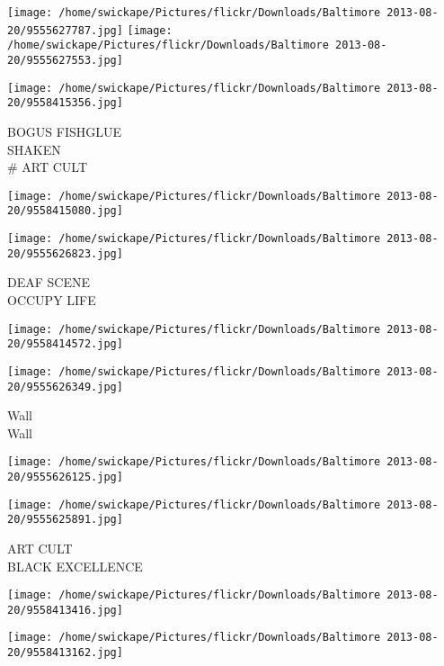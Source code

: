\documentclass[10pt,letterpaper]{article}
\begin{document}
\texttt{[image: /home/swickape/Pictures/flickr/Downloads/Baltimore 2013-08-20/9555627787.jpg]}
\texttt{[image: /home/swickape/Pictures/flickr/Downloads/Baltimore 2013-08-20/9555627553.jpg]}

\vspace{0.25in}
\texttt{[image: /home/swickape/Pictures/flickr/Downloads/Baltimore 2013-08-20/9558415356.jpg]}

BOGUS FISHGLUE\\
SHAKEN\\
\# ART CULT\\
\pagebreak

\texttt{[image: /home/swickape/Pictures/flickr/Downloads/Baltimore 2013-08-20/9558415080.jpg]}

\vspace{0.25in}
\texttt{[image: /home/swickape/Pictures/flickr/Downloads/Baltimore 2013-08-20/9555626823.jpg]}

DEAF SCENE\\
OCCUPY LIFE\\
\pagebreak

\texttt{[image: /home/swickape/Pictures/flickr/Downloads/Baltimore 2013-08-20/9558414572.jpg]}

\vspace{0.25in}
\texttt{[image: /home/swickape/Pictures/flickr/Downloads/Baltimore 2013-08-20/9555626349.jpg]}

Wall\\
Wall\\
\pagebreak

\texttt{[image: /home/swickape/Pictures/flickr/Downloads/Baltimore 2013-08-20/9555626125.jpg]}

\vspace{0.25in}
\texttt{[image: /home/swickape/Pictures/flickr/Downloads/Baltimore 2013-08-20/9555625891.jpg]}

ART CULT\\
BLACK EXCELLENCE\\
\pagebreak

\texttt{[image: /home/swickape/Pictures/flickr/Downloads/Baltimore 2013-08-20/9558413416.jpg]}

\vspace{0.25in}
\texttt{[image: /home/swickape/Pictures/flickr/Downloads/Baltimore 2013-08-20/9558413162.jpg]}
\end{document}

